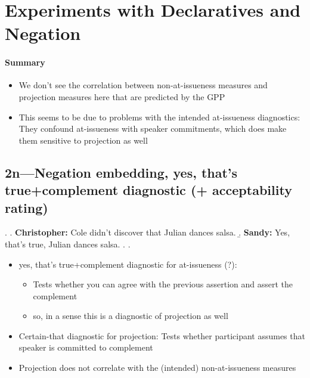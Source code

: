 \documentclass[11pt]{article}
\begin{document}
\tableofcontents


\pagebreak
\section{Experiments with Declaratives and Negation}

	\paragraph{Summary} %

		\begin{itemize}
			\item We don't see the correlation between non-at-issueness measures and projection measures here that are predicted by the GPP
			\item This seems to be due to problems with the intended at-issueness diagnostics: They confound at-issueness with speaker commitments, which does make them sensitive to projection as well
		\end{itemize}


	\subsection{2n---Negation embedding, yes, that's true+complement diagnostic (+ acceptability rating)}
			\ex. \a. \textbf{Christopher:} Cole didn’t discover that Julian dances salsa.
				\b. \textbf{Sandy:} Yes, that’s true, Julian dances salsa.
				\z.
			\z.

			\begin{itemize}
				
				\item yes, that's true+complement diagnostic for at-issueness (?):
				\begin{itemize}
					\item Tests whether you can agree with the previous assertion and assert the complement
					\item so, in a sense this is a diagnostic of projection as well
				\end{itemize}
				

				\item Certain-that diagnostic for projection: Tests whether participant assumes that speaker is committed to complement

				\item Projection does not correlate with the (intended) non-at-issueness measures
			\end{itemize}
\end{document}
